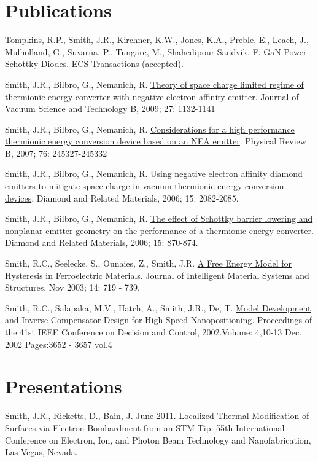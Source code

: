 \documentclass[letterpaper,margin,line]{res}
\begin{document}
\begin{resume}
\section{\sc Publications}

Tompkins, R.P., Smith, J.R., Kirchner, K.W., Jones, K.A., Preble, E., Leach, J., Mulholland, G., Suvarna, P., Tungare, M., Shahedipour-Sandvik, F. GaN Power Schottky Diodes. ECS Transactions (accepted).

Smith, J.R., Bilbro, G., Nemanich, R. \href{http://dx.doi.org/10.1116/1.3125282}{Theory of space charge limited regime of thermionic energy converter with negative electron affinity emitter}. Journal of Vacuum Science and Technology B, 2009; 27: 1132-1141

Smith, J.R., Bilbro, G., Nemanich, R. \href{http://dx.doi.org/10.1103/PhysRevB.76.245327}{Considerations for a high performance thermionic energy conversion device based on an NEA emitter}. Physical Review B, 2007; 76: 245327-245332

Smith, J.R., Bilbro, G., Nemanich, R. \href{http://dx.doi.org/10.1016/j.diamond.2006.09.011}{Using negative electron affinity diamond emitters to mitigate space charge in vacuum thermionic energy conversion devices}. Diamond and Related Materials, 2006; 15: 2082-2085.

Smith, J.R., Bilbro, G., Nemanich, R. \href{http://dx.doi.org/10.1016/j.diamond.2005.12.057}{The effect of Schottky barrier lowering and nonplanar emitter geometry on the performance of a thermionic energy converter}. Diamond and Related Materials, 2006; 15: 870-874.

Smith, R.C., Seelecke, S., Ounaies, Z., Smith, J.R. \href{http://dx.doi.org/10.1177/1045389X03038841}{A Free Energy Model for Hysteresis in Ferroelectric Materials}. Journal of Intelligent Material Systems and Structures, Nov 2003;  14:  719 - 739.

Smith, R.C., Salapaka, M.V., Hatch, A., Smith, J.R., De, T. \href{http://dx.doi.org/10.1109/CDC.2002.1184930}{Model Development and Inverse Compensator Design for High Speed Nanopositioning}. Proceedings of the 41st IEEE Conference on Decision and Control, 2002.Volume: 4,10-13 Dec. 2002 Pages:3652  - 3657 vol.4


\section{\sc Presentations}
Smith, J.R., Ricketts, D., Bain, J. June 2011. Localized Thermal Modification of Surfaces via Electron Bombardment from an STM Tip. 55th International Conference on Electron, Ion, and Photon Beam Technology and Nanofabrication, Las Vegas, Nevada.


\end{resume}
\end{document}
